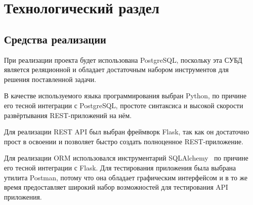 \chapter{Технологический раздел}

\section{Средства реализации}


При реализации проекта будет использована PostgreSQL\cite{postgresql}, поскольку эта 
СУБД является реляционной и обладает достаточным набором инструментов для решения поставленной задачи.

В качестве используемого языка программирования выбран Python\cite{python}, по причине его тесной интеграции с PostgreSQL, простоте синтаксиса и высокой скорости развёртывания REST-приложений на нём. 

Для реализации REST API был выбран фреймворк Flask\cite{flask}, так как он достаточно прост в освоении и позволяет быстро создать полноценное REST-приложение.

Для реализации ORM\cite{orm} использовался инструментарий 
SQLAlchemy~\cite{sqlalchemy} по причине его тесной интеграции с Flask. Для тестирования приложения была выбрана утилита Postman\cite{postman}, потому что она обладает графическим интерфейсом и в то же время предоставляет широкий набор возможностей для тестирования API приложения.


